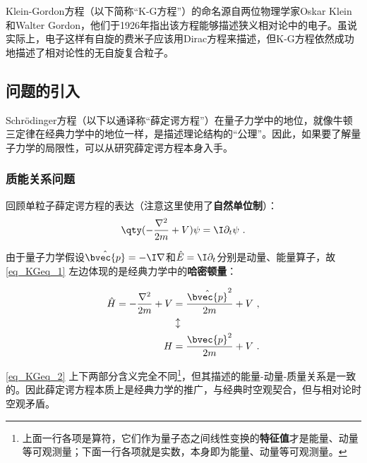 


Klein-Gordon方程（以下简称“K-G方程”）的命名源自两位物理学家Oskar Klein和Walter Gordon，他们于1926年指出该方程能够描述狭义相对论中的电子。虽说实际上，电子这样有自旋的费米子应该用Dirac方程来描述，但K-G方程依然成功地描述了相对论性的无自旋复合粒子。



\subsection{问题的引入}

Schrödinger方程（以下以通译称“薛定谔方程”）在量子力学中的地位，就像牛顿三定律在经典力学中的地位一样，是描述理论结构的“公理”。因此，如果要了解量子力学的局限性，可以从研究薛定谔方程本身入手。

\subsubsection{质能关系问题}

回顾单粒子薛定谔方程的表达（注意这里使用了\textbf{自然单位制}）：
\begin{equation}\label{eq_KGeq_1}
\qty(-\frac{\nabla^2}{2m}+V)\psi = \I \partial_t \psi~.
\end{equation}

由于量子力学假设$\hat{\bvec{p}}=-\I\nabla$和$\hat{E}=\I\partial_t$分别是动量、能量算子，故\autoref{eq_KGeq_1} 左边体现的是经典力学中的\textbf{哈密顿量}：

\begin{equation}\label{eq_KGeq_2}
\begin{aligned}
\hat{H}=-\frac{\nabla^2}{2m}+V &= \frac{\hat{\bvec{p}}^2}{2m}+V ~,\\
&\updownarrow\\
H &= \frac{\bvec{p}^2}{2m}+V~.
\end{aligned}
\end{equation}

\autoref{eq_KGeq_2} 上下两部分含义完全不同\footnote{上面一行各项是算符，它们作为量子态之间线性变换的\textbf{特征值}才是能量、动量等可观测量；下面一行各项就是实数，本身即为能量、动量等可观测量。}，但其描述的能量-动量-质量关系是一致的。因此薛定谔方程本质上是经典力学的推广，与经典时空观契合，但与相对论时空观矛盾。

